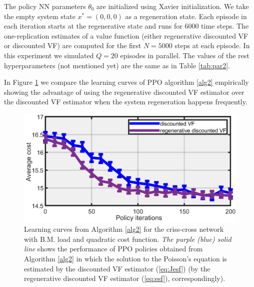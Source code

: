 \documentclass[11pt]{article}
\theoremstyle{definition}
\numberwithin{equation}{section}
\begin{document}
The policy NN parameters $\theta_0$ are initialized using Xavier initialization. We take the empty system state $x^* = (0,0,0)$ as a regeneration state. Each episode in each iteration starts at the regenerative state and runs for $6000$ time steps. The one-replication estimates of a value function (either regenerative discounted VF or discounted VF) are computed for the first $N=5000$ steps at each episode. In this experiment we simulated $Q=20$ episodes in parallel.  The values of the rest  hyperparameters (not mentioned yet) are  the same as  in Table \ref{tab:par2}.


In Figure \ref{fig:regVSinf} we compare the learning curves of PPO algorithm \ref{alg2}  empirically showing the advantage of using the regenerative discounted VF estimator over the discounted VF estimator when the system regeneration happens frequently.



\begin{figure}[H]
\centering%
\includegraphics[width=.5\linewidth]{regVSinf}
\caption[]{Learning curves from Algorithm \ref{alg2} for the criss-cross network with B.M. load and quadratic cost function.  \textit{The purple (blue) solid line} shows the performance of  PPO policies obtained from Algorithm \ref{alg2} in which
the solution to the Poisson's equation is estimated  by the discounted VF estimator (\ref{eq:Jesf})
 (by the regenerative discounted VF estimator (\ref{eq:esf}), correspondingly).}
 \label{fig:regVSinf}
\end{figure}
\end{document}
